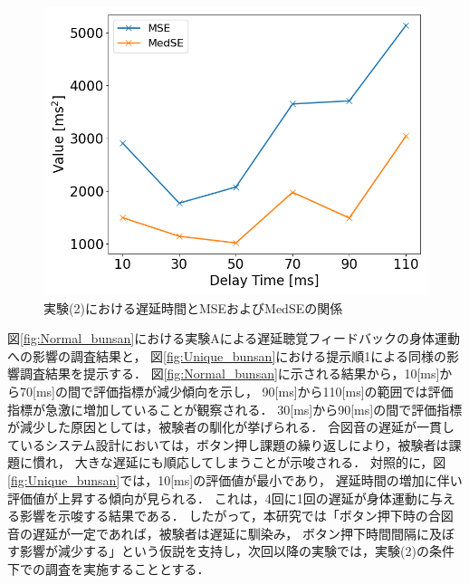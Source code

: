 \begin{figure}[bt]
  \centering
  \includegraphics[scale=0.5]{figures/Yobi/Var/MSE_MedSE.png}
  \caption{実験(2)における遅延時間とMSEおよびMedSEの関係}
  \label{fig:Yobi_MSE_MedSE}
\end{figure}
図\ref{fig:Normal_bunsan}における実験Aによる遅延聴覚フィードバックの身体運動への影響の調査結果と，
図\ref{fig:Unique_bunsan}における提示順1による同様の影響調査結果を提示する．
図\ref{fig:Normal_bunsan}に示される結果から，10[ms]から70[ms]の間で評価指標が減少傾向を示し，
90[ms]から110[ms]の範囲では評価指標が急激に増加していることが観察される．
30[ms]から90[ms]の間で評価指標が減少した原因としては，被験者の馴化が挙げられる．
合図音の遅延が一貫しているシステム設計においては，ボタン押し課題の繰り返しにより，被験者は課題に慣れ，
大きな遅延にも順応してしまうことが示唆される．
対照的に，図\ref{fig:Unique_bunsan}では，10[ms]の評価値が最小であり，
遅延時間の増加に伴い評価値が上昇する傾向が見られる．
これは，4回に1回の遅延が身体運動に与える影響を示唆する結果である．
したがって，本研究では「ボタン押下時の合図音の遅延が一定であれば，被験者は遅延に馴染み，
ボタン押下時間間隔に及ぼす影響が減少する」という仮説を支持し，次回以降の実験では，実験(2)の条件下での調査を実施することとする．

\newpage \newpage
